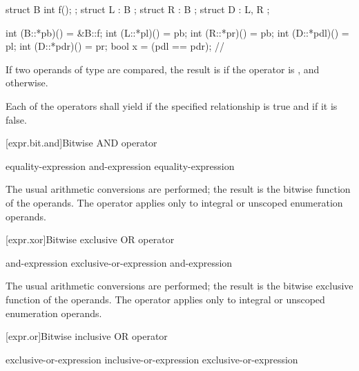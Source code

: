 \begin{codeblock}
struct B {
  int f();
};
struct L : B { };
struct R : B { };
struct D : L, R { };

int (B::*pb)() = &B::f;
int (L::*pl)() = pb;
int (R::*pr)() = pb;
int (D::*pdl)() = pl;
int (D::*pdr)() = pr;
bool x = (pdl == pdr);          // 
\end{codeblock}
\exitexample 

\pnum
If two operands of type  are compared, the result is
 if the operator is \tcode{==}, and  otherwise.

\pnum
Each of the operators shall yield  if the specified relationship is
true and  if it is false.

[expr.bit.and]{Bitwise AND operator}%
%
%
%
%

\begin{bnf}
\br
    equality-expression\br
    and-expression \terminal{\&} equality-expression
\end{bnf}

\pnum
The usual arithmetic conversions are performed; the result is the
bitwise  function of the operands. The operator
applies only to integral or unscoped enumeration operands.

[expr.xor]{Bitwise exclusive OR operator}%
%
%

\begin{bnf}
\br
    and-expression\br
    exclusive-or-expression \terminal{\^{}} and-expression
\end{bnf}

\pnum
The usual arithmetic conversions are performed; the result is the
bitwise exclusive  function of the operands. The
operator applies only to integral or unscoped enumeration operands.

[expr.or]{Bitwise inclusive OR operator}%
%
%

\begin{bnf}
\br
    exclusive-or-expression\br
    inclusive-or-expression \terminal{|} exclusive-or-expression
\end{bnf}

